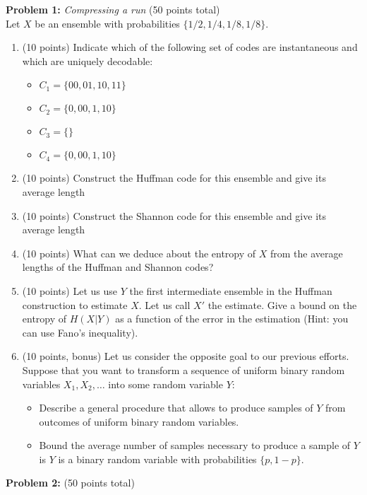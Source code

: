 \documentclass[11pt,a4paper,twoside]{article}
\begin{document}
\newpage
\noindent \textbf{Problem 1:} \emph{Compressing a run} (50 points total)\\
Let $X$ be an ensemble with probabilities $\{1/2,1/4,1/8,1/8\}$. 
\begin{enumerate}
\item (10 points) Indicate which of the following set of codes are instantaneous and which are uniquely decodable:
\begin{itemize}
\item $C_1=\{00,01,10,11\}$
\item $C_2=\{0,00,1,10\}$
\item $C_3=\{\}$
\item $C_4=\{0,00,1,10\}$
\end{itemize}
\item (10 points) Construct the Huffman code for this ensemble and give its average length
\item (10 points) Construct the Shannon code for this ensemble and give its average length
\item (10 points) What can we deduce about the entropy of $X$ from the average lengths of the Huffman and Shannon codes?
\item (10 points) Let us use $Y$ the first intermediate ensemble in the Huffman construction to estimate $X$. Let us call $X'$ the estimate. Give a bound on the entropy of $H(X|Y)$ as a function of the error in the estimation (Hint: you can use Fano's inequality).
\item (10 points, bonus) Let us consider the opposite goal to our previous efforts. Suppose that you want to transform a sequence of uniform binary random variables $X_1,X_2,\ldots$ into some random variable $Y$:
\begin{itemize}
\item Describe a general procedure that allows to produce samples of $Y$ from outcomes of uniform binary random variables.
\item Bound the average number of samples necessary to produce a sample of $Y$ is $Y$ is a binary random variable with probabilities $\{p,1-p\}.$
\end{itemize}
\end{enumerate}


\newpage
\noindent \textbf{Problem 2:} \emph{} (50 points total)\\
\end{document}

